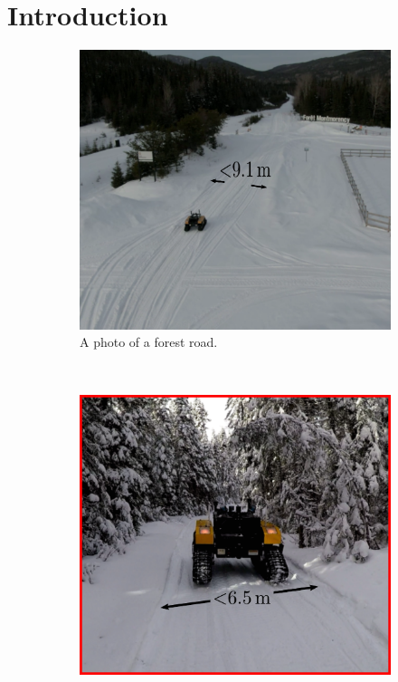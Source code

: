 \section{Introduction}
\label{sec:intro}

\lightlipsum[1]

\begin{figure} [h]
	\begin{center}
	\begin{subfigure}[b]{0.32\textwidth}
		\includegraphics[width=\linewidth]{figs/intro/large_path_inkscape.pdf}
		\caption{A photo of a forest road.}
		\label{fig:large_path}
	\end{subfigure}%
	~
	\begin{subfigure} [b] {0.32\textwidth}
		\includegraphics[width=\linewidth]{figs/intro/narrow_path_inkscape.pdf}

\end{subfigure}
\end{center}
\end{figure}
